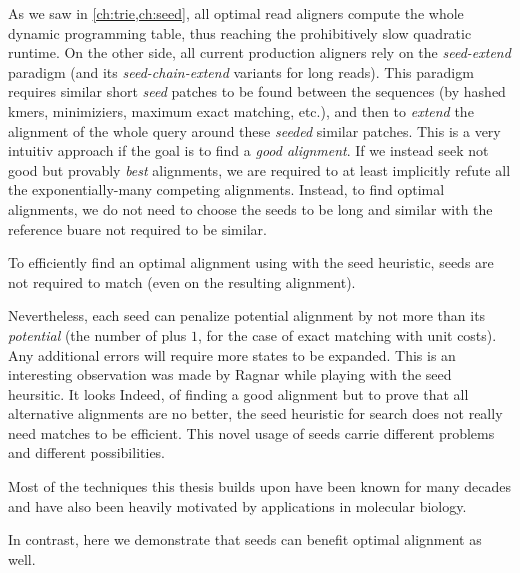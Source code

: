 As we saw in \cref{ch:trie,ch:seed}, all optimal read aligners compute the whole
dynamic programming table, thus reaching the prohibitively slow quadratic
runtime. On the other side, all current production aligners rely on the
\emph{seed-extend} paradigm (and its \emph{seed-chain-extend} variants for long
reads).
%
This paradigm requires similar short \emph{seed} patches to be found
between the sequences (by hashed kmers, minimiziers, maximum exact matching,
etc.), and then to \emph{extend} the alignment of the whole query around these
\emph{seeded} similar patches. This is a very intuitiv approach if the goal is
to find a \emph{good alignment}.
%
If we instead seek not good but provably \emph{best} alignments, we are required
to at least implicitly refute all the exponentially-many competing alignments.
%
Instead, to find optimal alignments, we do not need to choose the seeds to be
long and similar with the reference buare not required to be similar.
%
\begin{observation}
    To efficiently find an optimal alignment using \A with the seed heuristic,
    seeds are not required to match (even on the resulting alignment).
\end{observation}
%
Nevertheless, each seed can penalize potential alignment by not more than its
\emph{potential} (\ie the number of plus $1$, for the case of exact matching
with unit costs). Any additional errors will require more states to be expanded.
%
This is an interesting observation was made by Ragnar while playing with the
seed heursitic. It looks Indeed, of finding a good alignment but to prove that all
alternative alignments are no better, the seed heuristic for \A search does not
really need matches to be efficient.
%
This novel usage of seeds carrie different problems and different possibilities.

Most of the techniques this thesis builds upon have been known for many decades
and have also been heavily motivated by applications in molecular biology. 

In contrast, here we demonstrate that seeds can benefit optimal alignment as
well.

